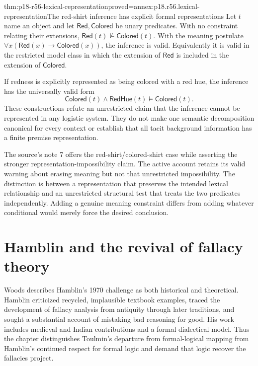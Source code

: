 \begin{hbtheorem}{thm:p18-r56-lexical-representation}{proved=annex:p18.r56.lexical-representation}{The red-shirt inference has explicit formal representations}
Let \(t\) name an object and let \(\mathsf{Red},\mathsf{Colored}\)
be unary predicates. With no constraint relating their extensions,
\(\mathsf{Red}(t)\not\models\mathsf{Colored}(t)\).
With the meaning postulate
\(\forall x(\mathsf{Red}(x)\to\mathsf{Colored}(x))\),
the inference is valid. Equivalently it is valid in the restricted
model class in which the extension of \(\mathsf{Red}\) is included
in the extension of \(\mathsf{Colored}\).

If redness is explicitly represented as being colored with a red hue,
the inference has the universally valid form
\[
 \mathsf{Colored}(t)\land\mathsf{RedHue}(t)
       \models\mathsf{Colored}(t).
\]
These constructions refute an unrestricted claim that the inference
cannot be represented in any logistic system. They do not make one
semantic decomposition canonical for every context or establish that
all tacit background information has a finite premise representation.
\end{hbtheorem}

The source's note 7 offers the red-shirt/colored-shirt case while
asserting the stronger representation-impossibility claim. The active
account retains its valid warning about erasing meaning but not that
unrestricted impossibility. The distinction is between a representation
that preserves the intended lexical relationship and an unrestricted
structural test that treats the two predicates independently.
Adding a genuine meaning constraint differs from adding whatever
conditional would merely force the desired conclusion.

\section{Hamblin and the revival of fallacy theory}

Woods describes Hamblin's 1970 challenge as both historical and theoretical.
Hamblin criticized recycled, implausible textbook examples, traced the
development of fallacy analysis from antiquity through later traditions,
and sought a substantial account of mistaking bad reasoning for good.
His work includes medieval and Indian contributions and a formal
dialectical model. Thus the chapter distinguishes Toulmin's departure
from formal-logical mapping from Hamblin's continued respect for formal
logic and demand that logic recover the fallacies project.

